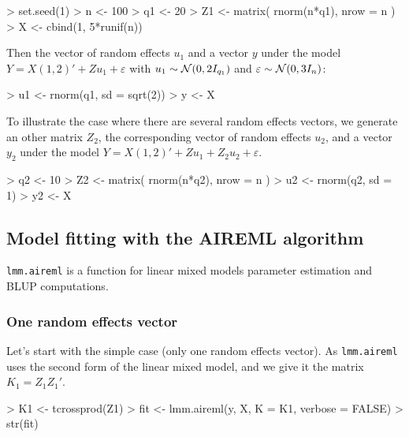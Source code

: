 \documentclass{article}
\renewenvironment{Schunk}{\vspace{\topsep}}{\vspace{\topsep}}
\begin{document}
\begin{Schunk}
\begin{Sinput}
> set.seed(1)
> n <- 100
> q1 <- 20
> Z1 <- matrix( rnorm(n*q1), nrow = n )
> X <- cbind(1, 5*runif(n))
\end{Sinput}
\end{Schunk}
 
  Then the vector of random effects $u_1$ and a vector $y$ under the model $Y = X (1,2)' + Z u_1 + \varepsilon$
  with $u_1 \sim \mathcal{N}(0, 2 I_{q_1})$ and $\varepsilon \sim\mathcal{N}(0, 3 I_n)$:

\begin{Schunk}
\begin{Sinput}
> u1 <- rnorm(q1, sd = sqrt(2))
> y <- X %
\end{Sinput}
\end{Schunk}

  To illustrate the case where there are several random effects vectors, we generate an 
  other matrix $Z_2$, the corresponding vector of random effects $u_2$, and a vector $y_2$ 
  under the model $Y = X (1,2)' + Z u_1 + Z_2 u_2 + \varepsilon$.

\begin{Schunk}
\begin{Sinput}
> q2 <- 10
> Z2 <- matrix( rnorm(n*q2), nrow = n ) 
> u2 <- rnorm(q2, sd = 1)
> y2 <- X %
\end{Sinput}
\end{Schunk}

  \subsection{Model fitting with the AIREML algorithm}

  \verb!lmm.aireml! is a function for linear mixed models parameter estimation
  and BLUP computations. 

  \subsubsection{One random effects vector}
  Let's start with the simple case (only one random effects vector).
  As  \verb!lmm.aireml! uses the second form of the linear mixed model,
  and we give it the matrix $K_1 = Z_1 Z_1'$.

\begin{Schunk}
\begin{Sinput}
> K1 <- tcrossprod(Z1)
> fit <- lmm.aireml(y, X, K = K1, verbose = FALSE)
> str(fit)
\end{Sinput}
\end{Schunk}
\end{document}
